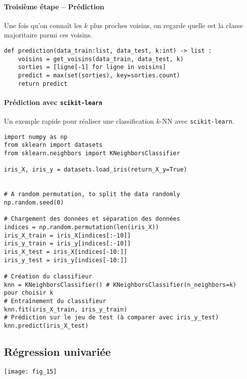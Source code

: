 {\paragraph*{Troisième étape -- Prédiction}

Une fois qu'on connaît les $k$ plus proches voisins, on regarde quelle est la classe majoritaire parmi ces voisins. 

\begin{lstlisting}
def prediction(data_train:list, data_test, k:int) -> list :
    voisins = get_voisins(data_train, data_test, k)
    sorties = [ligne[-1] for ligne in voisins]
    predict = max(set(sorties), key=sorties.count)
    return predict
\end{lstlisting}


\paragraph*{Prédiction avec \texttt{scikit-learn}}

Un exemple rapide pour réaliser une classification $k$-NN avec \texttt{scikit-learn}.
\begin{lstlisting}
import numpy as np
from sklearn import datasets
from sklearn.neighbors import KNeighborsClassifier

iris_X, iris_y = datasets.load_iris(return_X_y=True)


# A random permutation, to split the data randomly
np.random.seed(0)

# Chargement des données et séparation des données
indices = np.random.permutation(len(iris_X))
iris_X_train = iris_X[indices[:-10]]
iris_y_train = iris_y[indices[:-10]]
iris_X_test = iris_X[indices[-10:]]
iris_y_test = iris_y[indices[-10:]]

# Création du classifieur
knn = KNeighborsClassifier() # KNeighborsClassifier(n_neighbors=k) pour choisir k
# Entraînement du classifieur
knn.fit(iris_X_train, iris_y_train)
# Prédiction sur le jeu de test (à comparer avec iris_y_test)
knn.predict(iris_X_test)
\end{lstlisting}



\subsection{Régression univariée }


\begin{marginfigure}
\texttt{[image: fig\_15]}
\end{marginfigure}


}
